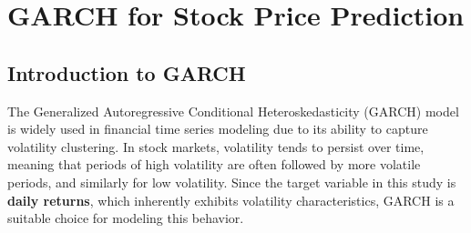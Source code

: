 


\section{GARCH for Stock Price Prediction}

\subsection{Introduction to GARCH}

The Generalized Autoregressive Conditional Heteroskedasticity (GARCH) \cite{BOLLERSLEV1986307} model is widely used in financial time series modeling due to its ability to capture volatility clustering. In stock markets, volatility tends to persist over time, meaning that periods of high volatility are often followed by more volatile periods, and similarly for low volatility. Since the target variable in this study is \textbf{daily returns}, which inherently exhibits volatility characteristics, GARCH is a suitable choice for modeling this behavior.

